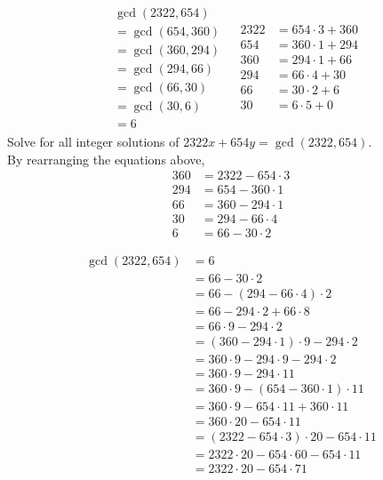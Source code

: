 \documentclass[a4paper]{article}
\begin{document}
\[\begin{array}{c|c}
\begin{aligned}
    &\gcd(2322,654)\\
    &=\gcd(654,360)\\
    &=\gcd(360,294)\\
    &=\gcd(294,66)\\
    &=\gcd(66,30)\\
    &=\gcd(30,6)\\
    &=\boxed6
\end{aligned}
    &
\begin{aligned}
    2322&=654\cdot3+360\\
    654&=360\cdot1+294\\
    360&=294\cdot1+66\\
    294&=66\cdot4+30\\
    66&=30\cdot2+6\\
    30&=6\cdot5+0
\end{aligned}
\end{array}\]
Solve for all integer solutions of \(2322x+654y=\gcd(2322,654)\).\\
By rearranging the equations above,
\[\begin{aligned}
    360&=2322-654\cdot3\\
    294&=654-360\cdot1\\
    66&=360-294\cdot1\\
    30&=294-66\cdot4\\
    6&=66-30\cdot2
\end{aligned}\]

\[\begin{aligned}
    \gcd(2322,654)&=6\\
    &=66-30\cdot2\\
    &=66-(294-66\cdot4)\cdot2\\
    &=66-294\cdot2+66\cdot8\\
    &=66\cdot9-294\cdot2\\
    &=(360-294\cdot1)\cdot9-294\cdot2\\
    &=360\cdot9-294\cdot9-294\cdot2\\
    &=360\cdot9-294\cdot11\\
    &=360\cdot9-(654-360\cdot1)\cdot11\\
    &=360\cdot9-654\cdot11+360\cdot11\\
    &=360\cdot20-654\cdot11\\
    &=(2322-654\cdot3)\cdot20-654\cdot11\\
    &=2322\cdot20-654\cdot60-654\cdot11\\
    &=2322\cdot20-654\cdot71
\end{aligned}\]
\end{document}
